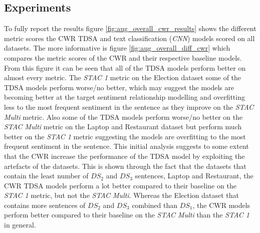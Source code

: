 \subsection{Experiments}
To fully report the results figure \ref{fig:aug_overall_cwr_results} shows the different metric scores the CWR TDSA and text classification (\textit{CNN}) models scored on all datasets. The more informative is figure \ref{fig:aug_overall_diff_cwr} which compares the metric scores of the CWR and their respective baseline models. From this figure it can be seen that all of the TDSA models perform better on almost every metric. The \textit{STAC 1} metric on the Election dataset some of the TDSA models perform worse/no better, which may suggest the models are becoming better at the target sentiment relationship modelling and overfitting less to the most frequent sentiment in the sentence as they improve on the \textit{STAC Multi} metric. Also some of the TDSA models perform worse/no better on the \textit{STAC Multi} metric on the Laptop and Restaurant dataset but perform much better on the \textit{STAC 1} metric suggesting the models are overfitting to the most frequent sentiment in the sentence. This initial analysis suggests to some extent that the CWR increase the performance of the TDSA model by exploiting the artefacts of the datasets. This is shown through the fact that the datasets that contain the least number of $DS_2$ and $DS_3$ sentences, Laptop and Restaurant, the CWR TDSA models perform a lot better compared to their baseline on the \textit{STAC 1} metric, but not the \textit{STAC Multi}. Whereas the Election dataset that contains more sentences of $DS_2$ and $DS_3$ combined than $DS_1$, the CWR models perform better compared to their baseline on the \textit{STAC Multi} than the \textit{STAC 1} in general. 

